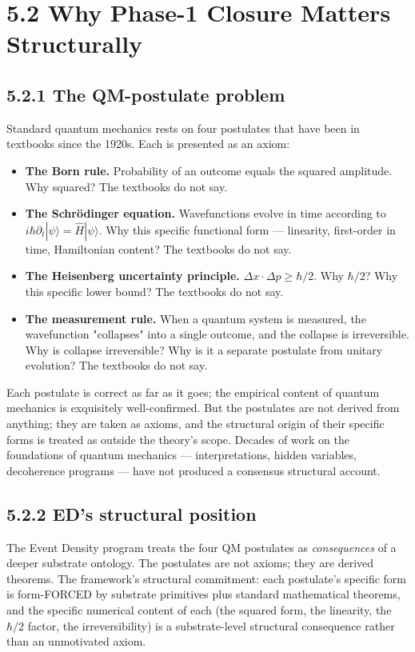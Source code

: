 \documentclass[11pt]{book}
\begin{document}
\section{5.2 Why Phase-1 Closure Matters Structurally}

\subsection{5.2.1 The QM-postulate problem}

Standard quantum mechanics rests on four postulates that have been in textbooks since the 1920s. Each is presented as an axiom:

\begin{itemize}
\item \textbf{The Born rule.} Probability of an outcome equals the squared amplitude. Why squared? The textbooks do not say.
\item \textbf{The Schrödinger equation.} Wavefunctions evolve in time according to $i\hbar\partial_t |\psi\rangle = \hat H |\psi\rangle$. Why this specific functional form — linearity, first-order in time, Hamiltonian content? The textbooks do not say.
\item \textbf{The Heisenberg uncertainty principle.} $\Delta x \cdot \Delta p \geq \hbar/2$. Why $\hbar/2$? Why this specific lower bound? The textbooks do not say.
\item \textbf{The measurement rule.} When a quantum system is measured, the wavefunction "collapses" into a single outcome, and the collapse is irreversible. Why is collapse irreversible? Why is it a separate postulate from unitary evolution? The textbooks do not say.
\end{itemize}

Each postulate is correct as far as it goes; the empirical content of quantum mechanics is exquisitely well-confirmed. But the postulates are not derived from anything; they are taken as axioms, and the structural origin of their specific forms is treated as outside the theory's scope. Decades of work on the foundations of quantum mechanics — interpretations, hidden variables, decoherence programs — have not produced a consensus structural account.

\subsection{5.2.2 ED's structural position}

The Event Density program treats the four QM postulates as \textit{consequences} of a deeper substrate ontology. The postulates are not axioms; they are derived theorems. The framework's structural commitment: each postulate's specific form is form-FORCED by substrate primitives plus standard mathematical theorems, and the specific numerical content of each (the squared form, the linearity, the $\hbar/2$ factor, the irreversibility) is a substrate-level structural consequence rather than an unmotivated axiom.
\end{document}
